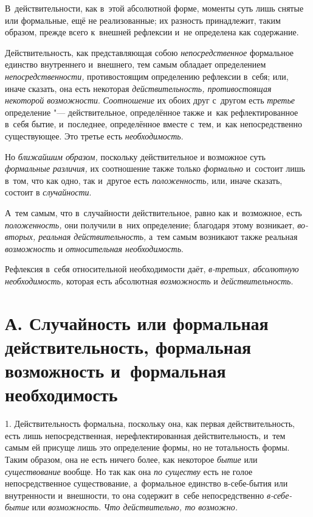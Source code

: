 В~действительности, как в~этой абсолютной форме, моменты суть лишь снятые
или формальные, ещё не реализованные; их разность принадлежит, таким
образом, прежде всего к~внешней рефлексии и~не определена как содержание.

Действительность, как представляющая собою
{\em непосредственное} формальное единство внутреннего
и~внешнего, тем самым обладает определением
{\em непосредственности,} противостоящим определению
рефлексии в~себя; или, иначе сказать, она есть некоторая
{\em действительность, противостоящая некоторой
возможности}. {\em Соотношение} их обоих друг с~другом
есть {\em третье} определение "--- действительное,
определённое также и~как рефлектированное в~себя бытие, и~последнее,
определённое вместе с~тем, и~как непосредственно существующее. Это третье
есть {\em необходимость}.

Но {\em ближайшим образом,} поскольку действительное и
возможное суть {\em формальные различия,} их
соотношение также только {\em формально} и~состоит лишь
в~том, что как одно, так и~другое есть
{\em положенность,} или, иначе сказать, состоит в {\em случайности}.

А~тем самым, что в~случайности действительное, равно как и~возможное, есть
{\em положенность,} они получили в~них определение;
благодаря этому возникает, {\em во-вторых, реальная
действительность,} а~тем самым возникают также реальная
{\em возможность} и {\em относительная необходимость}.

Рефлексия в~себя относительной необходимости даёт,
{\em в-третьих, абсолютную необходимость,} которая есть
абсолютная {\em возможность} и {\em действительность}.


\section[А. Случайность или формальная действительность, формальная возможность и~формальная необходимость]%
{А. Случайность или формальная действительность, формальная возможность и~формальная необходимость}

1. Действительность формальна, поскольку она,
как первая действительность, есть лишь непосредственная, нерефлектированная
действительность, и~тем самым ей присуще лишь это определение формы, но не
тотальность формы. Таким образом, она не есть ничего более, как некоторое
{\em бытие} или {\em существование}
вообще. Но так как она {\em по существу} есть не голое
непосредственное существование, а~формальное единство в-себе-бытия или
внутренности и~внешности, то она содержит в~себе непосредственно
{\em в-себе-бытие} или {\em возможность}. {\em Что действительно, то возможно.}

